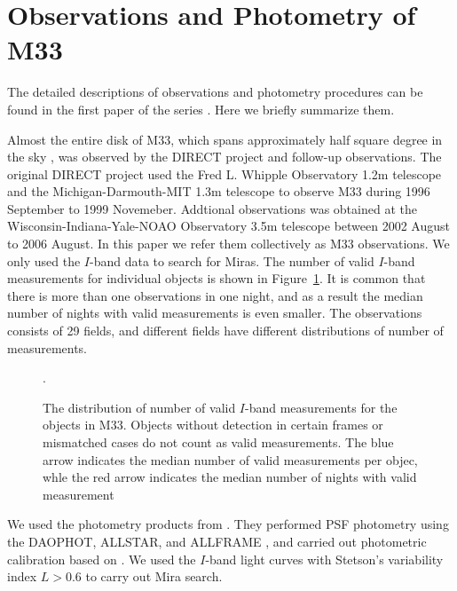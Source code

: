 \section{Observations and Photometry of M33} \label{sec.observations}

The detailed descriptions of observations and photometry procedures can be found in the first paper of the series \citep{2011ApJS..193...26P}. Here we briefly summarize them.

Almost the entire disk of M33, which spans approximately half square degree in the sky \citep{1895MNRAS..56...70R}, was observed by the DIRECT project and follow-up observations. The original DIRECT project used the Fred L. Whipple Observatory 1.2m telescope and the Michigan-Darmouth-MIT 1.3m telescope to observe M33 during 1996 September to 1999 Novemeber. Addtional observations was obtained at the Wisconsin-Indiana-Yale-NOAO Observatory 3.5m telescope between 2002 August to 2006 August. In this paper we refer them collectively as M33 observations. We only used the $I$-band data to search for Miras. The number of valid $I$-band measurements for individual objects is shown in Figure~\ref{fig.n_obs}. It is common that there is more than one observations in one night, and as a result the median number of nights with valid measurements is even smaller. The observations consists of 29 fields, and different fields have different distributions of number of measurements.

\begin{figure}
\caption{The distribution of number of valid $I$-band measurements for the objects in M33. Objects without detection in certain frames or mismatched cases do not count as valid measurements. The blue arrow indicates the median number of valid measurements per objec, whle the red arrow indicates the median number of nights with valid measurement}.\label{fig.n_obs}
\end{figure}

We used the photometry products from \cite{2011ApJS..193...26P}. They performed PSF photometry using the DAOPHOT, ALLSTAR, and ALLFRAME \citep{1987PASP...99..191S,1994PASP..106..250S}, and carried out photometric calibration based on \cite{2006AJ....131.2478M}. We used the $I$-band light curves with Stetson's variability index $L>0.6$ \citep{1996PASP..108..851S} to carry out Mira search.
